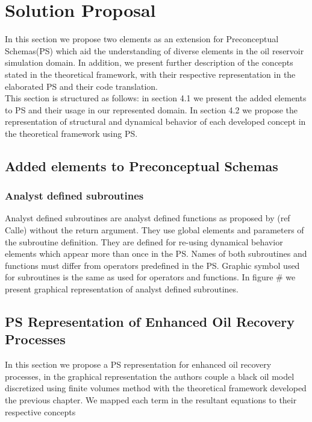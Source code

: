\chapter{Solution Proposal}

In this section we propose two elements as an extension for Preconceptual Schemas(PS) which aid the understanding of diverse elements in the oil reservoir simulation domain. In addition, we present further description of the concepts stated in the theoretical framework, with their respective representation in the elaborated PS and their code translation.
\\
This section is structured as follows: in section 4.1 we present the added elements to PS and their usage in our represented domain. In section 4.2 we propose the representation of structural and dynamical behavior of each developed concept in the theoretical framework using PS.

\section{Added elements to Preconceptual Schemas}
\subsection{Analyst defined subroutines}
Analyst defined subroutines are analyst defined functions as proposed by (ref Calle) without the return argument. They use global elements and parameters of the subroutine definition. They are defined for re-using dynamical behavior elements which appear more than once in the PS. Names of both subroutines and functions must differ from operators predefined in the PS. Graphic symbol used for subroutines is the same as used for operators and functions. In figure \# we present graphical representation of analyst defined subroutines.

\section{PS Representation of Enhanced Oil Recovery Processes}
In this section we propose a PS representation for enhanced oil recovery processes, in the graphical representation the authors couple a black oil model discretized using finite volumes method with the theoretical framework developed the previous chapter. We mapped each term in the resultant equations to their respective concepts 



